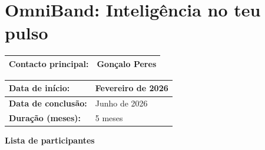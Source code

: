\documentclass[11pt, a4paper]{article}
\begin{document}


\tableofcontents
\newpage

\section*{OmniBand: Inteligência no teu pulso}

\begin{abstract}
    O OmniBand é um wearable IoT de baixo consumo, assente em TinyML, pensado para automação residencial. O conceito original — uma ``varinha mágica'' no pulso combinando voz (contexto) e gesto (ação) com processamento local — foi adaptado ao longo do projeto devido a condicionantes logísticas. Todos os materiais chegaram tardiamente e o microcontrolador planeado (M5StickC Plus2) nunca esteve disponível. A equipa pivotou para o M5CoreInk (único hardware disponível), substituindo a seleção de contexto por voz por um sistema de deteção de palmas (1, 2 ou 3 palmas) e o backend cloud por um servidor local Flask integrado com Home Assistant. O resultado é um protótipo funcional que demonstra controlo residencial por gestos com Machine Learning na periferia (Edge Impulse), comunicação Wi-Fi e um dashboard web em tempo real.
\end{abstract}

\begin{table}[H]
    \small
    \begin{tabular}{|p{}|p{}|}
        \hline
        \cellcolor{lightgray}\textbf{Contacto principal:} & Gonçalo Peres \\
        \hline
    \end{tabular}
\end{table}

\begin{table}[H]
    \small
    \begin{tabular}{|p{}|p{}|}
        \hline
        \cellcolor{lightgray}\textbf{Data de início:} & Fevereiro de 2026 \\
        \hline
        \cellcolor{lightgray}\textbf{Data de conclusão:} & Junho de 2026 \\
        \hline
        \cellcolor{lightgray}\textbf{Duração (meses):} & 5 meses \\
        \hline
    \end{tabular}
\end{table}

\textbf{Lista de participantes}
\end{document}
